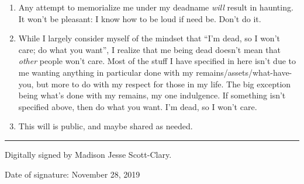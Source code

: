 \begin{enumerate}
\def\labelenumi{\arabic{enumi}.}
\tightlist
\item
  Any attempt to memorialize me under my deadname \emph{will} result in haunting. It won't be pleasant: I know how to be loud if need be. Don't do it.
\item
  While I largely consider myself of the mindset that ``I'm dead, so I won't care; do what you want'', I realize that me being dead doesn't mean that \emph{other} people won't care. Most of the stuff I have specified in here isn't due to me wanting anything in particular done with my remains/assets/what-have-you, but more to do with my respect for those in my life. The big exception being what's done with my remains, my one indulgence. If something isn't specified above, then do what you want. I'm dead, so I won't care.
\item
  This will is public, and maybe shared as needed.
\end{enumerate}

\begin{center}\rule{0.5\linewidth}{0.5pt}\end{center}

Digitally signed by Madison Jesse Scott-Clary.

Date of signature: November 28, 2019
